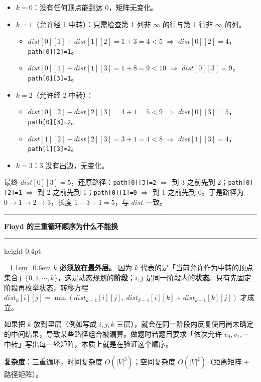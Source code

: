 \documentclass[11pt,openany,UTF8]{ctexbook}
\newcommand{\callouthead}[2]{%
  \par\addvspace{7pt}\noindent
  {\color{#1}\rule[-0.15em]{3pt}{1.05em}}\hspace{0.5em}%
  {\bfseries\color{#1}#2}\par\nobreak\vspace{-0.35em}%
  {\color{rulesep}\hrule height 0.4pt}\nobreak\vspace{0.45em}%
  \begingroup\small\setlength{\parindent}{0pt}%
  \leftskip=1.1em\rightskip=0.6em\noindent\ignorespaces}
\newcommand{\calloutend}{\par\endgroup\addvspace{7pt}}
\newenvironment{callkey}[1]{\callouthead{keybar}{#1}}{\calloutend}
\begin{document}
\begin{itemize}
\item \textbf{$k=0$}：没有任何顶点能到达 0，矩阵无变化。
\item \textbf{$k=1$}（允许经 1 中转）：只需检查第 1 列非 $\infty$ 的行与第 1 行非 $\infty$ 的列。
\begin{itemize}
\item $dist[0][1]+dist[1][2]=1+3=4<5$ $\Rightarrow$ $dist[0][2]=4$，\texttt{path[0]\allowbreak{}[2]\allowbreak{}=\allowbreak{}1}。
\item $dist[0][1]+dist[1][3]=1+8=9<10$ $\Rightarrow$ $dist[0][3]=9$，\texttt{path[0]\allowbreak{}[3]\allowbreak{}=\allowbreak{}1}。
\end{itemize}
\item \textbf{$k=2$}（允许经 2 中转）：
\begin{itemize}
\item $dist[0][2]+dist[2][3]=4+1=5<9$ $\Rightarrow$ $dist[0][3]=5$，\texttt{path[0]\allowbreak{}[3]\allowbreak{}=\allowbreak{}2}。
\item $dist[1][2]+dist[2][3]=3+1=4<8$ $\Rightarrow$ $dist[1][3]=4$，\texttt{path[1]\allowbreak{}[3]\allowbreak{}=\allowbreak{}2}。
\end{itemize}
\item \textbf{$k=3$}：3 没有出边，无变化。
\end{itemize}
最终 $dist[0][3]=5$，还原路径：\texttt{path[0]\allowbreak{}[3]\allowbreak{}=\allowbreak{}2} $\Rightarrow$ 到 3 之前先到 2；\texttt{path[0]\allowbreak{}[2]\allowbreak{}=\allowbreak{}1} $\Rightarrow$ 到 2 之前先到 1；\texttt{path[0]\allowbreak{}[1]\allowbreak{}=\allowbreak{}0} $\Rightarrow$ 到 1 之前先到 0。于是路径为 $0\to 1\to 2\to 3$，长度 $1+3+1=5$，与 $dist$ 一致。

\begin{callkey}{Floyd 的三重循环顺序为什么不能换}
\textbf{$k$ 必须放在最外层。} 因为 $k$ 代表的是「当前允许作为中转的顶点集合」$\{0,1,\cdots,k\}$，这是动态规划的\textbf{阶段}；$i,j$ 是同一阶段内的\textbf{状态}。只有先固定阶段再枚举状态，转移方程 $dist_k[i][j]=\min(dist_{k-1}[i][j],\ dist_{k-1}[i][k]+dist_{k-1}[k][j])$ 才成立。

如果把 $k$ 放到里层（例如写成 $i,j,k$ 三层），就会在同一阶段内反复使用尚未确定的中间结果，导致某些路径组合被漏算。做题时若题目要求「依次允许 $v_0,v_1,\cdots$ 中转」写出每一轮矩阵，本质上就是在验证这个顺序。

\end{callkey}

\textbf{复杂度}：三重循环，时间复杂度 $O(|V|^{3})$；空间复杂度 $O(|V|^{2})$（距离矩阵 + 路径矩阵）。
\end{document}
